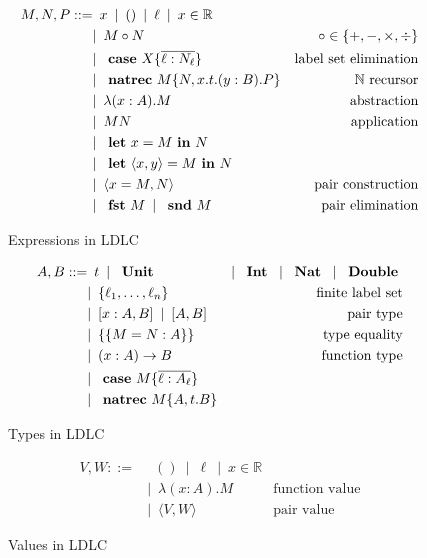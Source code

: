 \begin{figure}
\begin{align*}
 M,N,P ::=
    & \enspace x \enspace|\enspace
      () \enspace|\enspace
      \ell \enspace|\enspace
      x \in \mathbb{R} \\
    & |\enspace M \circ N & \circ \in \{+,-,\times,\div\} \\
    & |\enspace \text{ \textbf{case} } X \{\overline{\ell : N_\ell}\} & \text{label set elimination} \\
    & |\enspace \text{ \textbf{natrec} } M \{ N, x . t . (y : B) . P \} & \mathbb{N}\text{ recursor} \\
    & |\enspace \lambda (x : A).M & \text{abstraction} \\
    & |\enspace M N & \text{application}\\
    & |\enspace \text{ \textbf{let} } x = M \text{ \textbf{in} } N \\
    & |\enspace \text{ \textbf{let} } \langle x, y \rangle = M \text{ \textbf{in} } N \\
    & |\enspace \langle x = M, N \rangle & \text{pair construction}\\
    & |\enspace \text{ \textbf{fst} } M \enspace|\enspace \text{ \textbf{snd} } M & \text{pair elimination}
\end{align*}
\caption{Expressions in LDLC}
\label{fig:ldlc-expressions}
\end{figure}

\begin{figure}
\begin{align*}
 A, B ::=
    & \enspace t \enspace|\enspace
      \text{ \textbf{Unit} }
    & |\enspace \text{ \textbf{Int} } \enspace|\enspace
      \text{ \textbf{Nat} } \enspace|\enspace
      \text{ \textbf{Double} } \\
    & |\enspace \{ \ell_1, \dots, \ell_n \} & \text{finite label set} \\
    & |\enspace [x:A,B] \enspace|\enspace [A,B] & \text{pair type} \\
    & |\enspace \{\{ M = N : A \}\} & \text{type equality} \\
    & |\enspace (x:A) \rightarrow B & \text{function type} \\
    & |\enspace \text{ \textbf{case} } M \{\overline{\ell : A_\ell}\} \\
    & |\enspace \text{ \textbf{natrec} } M \{ A, t.B \}
\end{align*}
\caption{Types in LDLC}
\label{fig:ldlc-types}
\end{figure}

\begin{figure}
\begin{align*}
    V, W ::=
    & \enspace () \enspace|\enspace
      \ell \enspace|\enspace
      x \in \mathbb{R} \\
    & |\enspace \lambda (x:A).M & \text{function value} \\
    & |\enspace \langle V, W \rangle & \text{pair value}
\end{align*}
\caption{Values in LDLC}
\label{fig:ldlc-values}
\end{figure}


